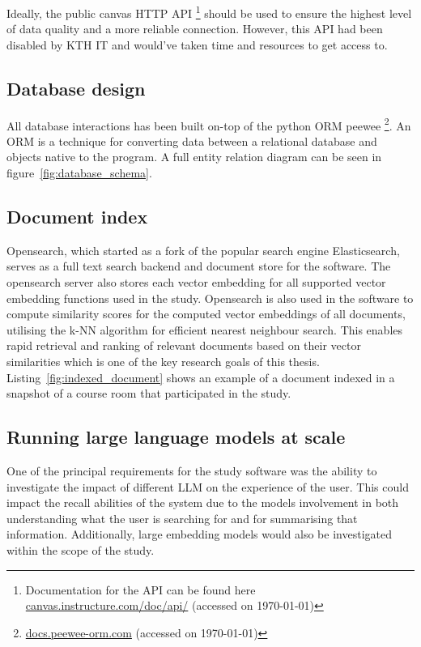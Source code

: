 Ideally, the public canvas HTTP API \footnote{Documentation for the API can be found here \href{https://canvas.instructure.com/doc/api/}{canvas.instructure.com/doc/api/} (accessed on \today)} should be used to ensure the highest level of data quality and a more reliable connection. However, this API had been disabled by KTH IT and would’ve taken time and resources to get access to.


\subsection{Database design}


All database interactions has been built on-top of the python \gls{ORM} peewee \footnote{\href{http://docs.peewee-orm.com/en/latest/}{docs.peewee-orm.com} (accessed on \today)}. An \gls{ORM} is a technique for converting data between a relational database and objects native to the program. A full entity relation diagram can be seen in figure~\ref{fig:database_schema}.





\subsection{Document index}


Opensearch, which started as a fork of the popular search engine Elasticsearch, serves as a full text search backend and document store for the software. The opensearch server also stores each vector embedding for all supported vector embedding functions used in the study. Opensearch is also used in the software to compute similarity scores for the computed vector embeddings of all documents, utilising the k-NN algorithm for efficient nearest neighbour search. This enables rapid retrieval and ranking of relevant documents based on their vector similarities which is one of the key research goals of this thesis. Listing~\ref{fig:indexed_document} shows an example of a document indexed in a snapshot of a course room that participated in the study.





\subsection{Running large language models at scale}


One of the principal requirements for the study software was the ability to investigate the impact of different \gls{LLM} on the experience of the user. This could impact the recall abilities of the system due to the models involvement in both understanding what the user is searching for and for summarising that information. Additionally, large embedding models would also be investigated within the scope of the study.


